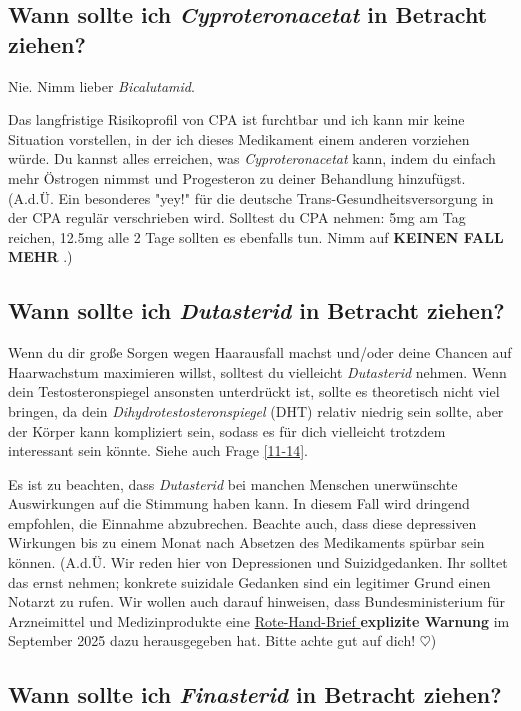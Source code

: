\documentclass{article}
\begin{document}
\subsection{Wann sollte ich \textit{Cyproteronacetat} in Betracht ziehen?}

Nie. Nimm lieber \textit{Bicalutamid}.

Das langfristige Risikoprofil von CPA ist furchtbar und ich kann mir keine Situation vorstellen, in der ich dieses Medikament einem anderen vorziehen würde. Du kannst alles erreichen, was \textit{Cyproteronacetat} kann, indem du einfach mehr Östrogen nimmst und Progesteron zu deiner Behandlung hinzufügst. (A.d.Ü. Ein besonderes "yey!" für die deutsche Trans-Gesundheitsversorgung in der CPA regulär verschrieben wird. Solltest du CPA nehmen: 5mg am Tag reichen, 12.5mg alle 2 Tage sollten es ebenfalls tun. Nimm auf \textbf{KEINEN FALL MEHR }.)

\subsection{Wann sollte ich \textit{Dutasterid} in Betracht ziehen?}

Wenn du dir große Sorgen wegen Haarausfall machst und/oder deine Chancen auf Haarwachstum maximieren willst, solltest du vielleicht \textit{Dutasterid} nehmen. Wenn dein Testosteronspiegel ansonsten unterdrückt ist, sollte es theoretisch nicht viel bringen, da dein \textit{Dihydrotestosteronspiegel} (DHT) relativ niedrig sein sollte, aber der Körper kann kompliziert sein, sodass es für dich vielleicht trotzdem interessant sein könnte. Siehe auch Frage \ref{11-14}.

Es ist zu beachten, dass \textit{Dutasterid} bei manchen Menschen unerwünschte Auswirkungen auf die Stimmung haben kann. In diesem Fall wird dringend empfohlen, die Einnahme abzubrechen. Beachte auch, dass diese depressiven Wirkungen bis zu einem Monat nach Absetzen des Medikaments spürbar sein können. (A.d.Ü. Wir reden hier von Depressionen und Suizidgedanken. Ihr solltet das ernst nehmen; konkrete suizidale Gedanken sind ein legitimer Grund einen Notarzt zu rufen. Wir wollen auch darauf hinweisen, dass Bundesministerium für Arzneimittel und Medizinprodukte eine \href{https://www.bfarm.de/SharedDocs/Risikoinformationen/Pharmakovigilanz/DE/RHB/2025/rhb-finasterid.pdf}{Rote-Hand-Brief }\textbf{explizite Warnung} im September 2025 dazu herausgegeben hat. Bitte achte gut auf dich! $\heartsuit$)

\subsection{Wann sollte ich \textit{Finasterid} in Betracht ziehen?}
\end{document}
